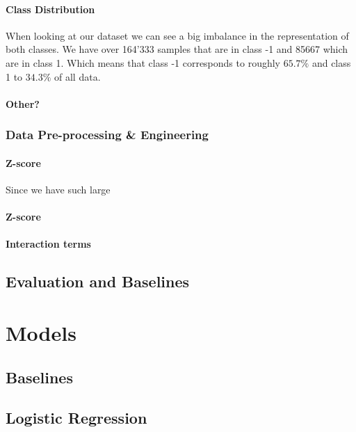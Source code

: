 \documentclass[10pt,conference,compsocconf]{IEEEtran}
\begin{document}
\paragraph{Class Distribution} When looking at our dataset we can see a big imbalance in the representation of both classes. We have over 164'333 samples that are in class -1 and 85667 which are in class 1. Which means that class -1 corresponds to roughly $65.7\%$ and class 1 to $34.3\%$ of all data. 
\paragraph{Other?}

\subsubsection{Data Pre-processing \& Engineering}
\paragraph*{}
\paragraph{Z-score} Since we have such large  
\paragraph{}
\paragraph{Z-score}
\paragraph{Interaction terms}

\subsection{Evaluation and Baselines}

\section{Models}
\subsection{Baselines}
\subsection{Logistic Regression}
\end{document}
